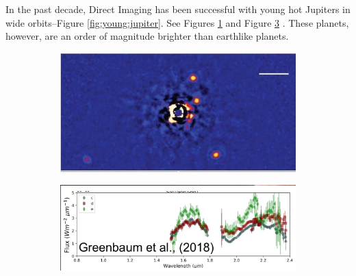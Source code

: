 \documentclass[]{article}
\begin{document}
In the past decade, Direct Imaging has been successful with young hot Jupiters in wide orbits--Figure \ref{fig:young:jupiter}. See  Figures  \ref{fig:young:jupiter1}\cite{marois2010images} and Figure \ref{fig:young:jupiter2}
\cite{greenbaum2018gpi}. These planets, however, are an order of magnitude brighter than earthlike planets.

\begin{figure}[H]
	\caption{Success with Young Jupiter-like Planets in Distant Orbits}\label{fig:young:jupiter}
	\begin{subfigure}[b]{0.45\textwidth}
		\caption{}\label{fig:young:jupiter1}
		\includegraphics[width=\textwidth]{DirectImaging1.jpg}
	\end{subfigure}
	\begin{subfigure}[b]{0.45\textwidth}
		\caption{}\label{fig:young:jupiter2}
		\includegraphics[width=\textwidth]{DirectImaging2.jpg}
	\end{subfigure}
\end{figure}
\end{document}
